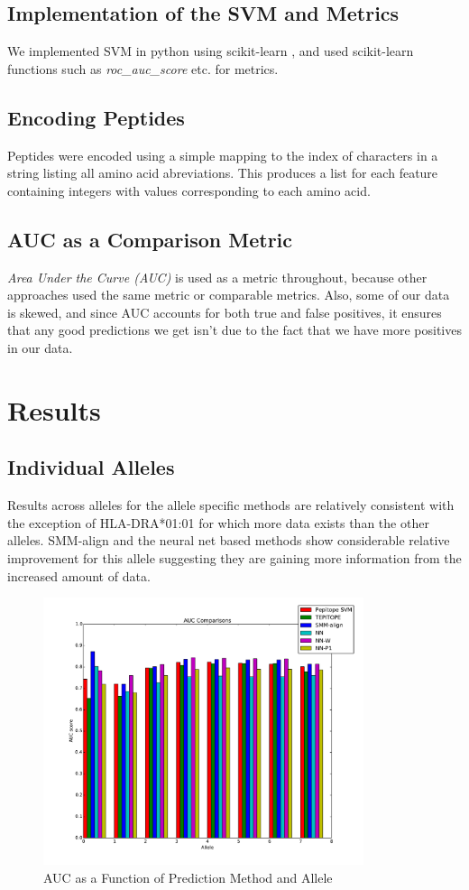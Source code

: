\documentclass[journal]{IEEEtran}
\begin{document}
\subsection{Implementation of the SVM and Metrics}
We implemented SVM in python using scikit-learn \cite{ScikitLearn}, and used scikit-learn functions such as \textit{roc\_auc\_score} etc. for metrics.

\subsection{Encoding Peptides}
Peptides were encoded using a simple mapping to the index of characters in a string listing all amino acid abreviations.  This produces a list for each feature containing integers with values corresponding to each amino acid.  


\subsection{AUC as a Comparison Metric} 
\textit{Area Under the Curve (AUC)} is used as a metric throughout, because other approaches used the same metric or comparable metrics. Also, some of our data is skewed, and since AUC accounts for both true and false positives, it ensures that any good predictions we get isn't due to the fact that we have more positives in our data.


\section{Results}

\subsection{Individual Alleles}
Results across alleles for the allele specific methods are relatively consistent with the exception of HLA-DRA*01:01 for which more data exists than the other alleles.  SMM-align and the neural net based methods show considerable relative improvement for this allele suggesting they are gaining more information from the increased amount of data.

\begin{figure}[!h]
\centering
\includegraphics[width=3.7in]{individual}
\caption{AUC as a Function of Prediction Method and Allele}
\label{fig_sim}
\end{figure}
\end{document}
